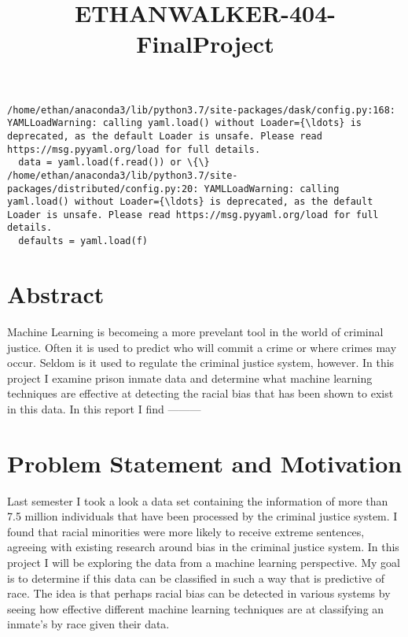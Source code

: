 \documentclass[11pt]{article}
\title{ETHANWALKER-404-FinalProject}
\begin{document}
    
    
    \maketitle
    
    

    
    \begin{Verbatim}[commandchars=\\\{\}]
/home/ethan/anaconda3/lib/python3.7/site-packages/dask/config.py:168: YAMLLoadWarning: calling yaml.load() without Loader={\ldots} is deprecated, as the default Loader is unsafe. Please read https://msg.pyyaml.org/load for full details.
  data = yaml.load(f.read()) or \{\}
/home/ethan/anaconda3/lib/python3.7/site-packages/distributed/config.py:20: YAMLLoadWarning: calling yaml.load() without Loader={\ldots} is deprecated, as the default Loader is unsafe. Please read https://msg.pyyaml.org/load for full details.
  defaults = yaml.load(f)

    \end{Verbatim}

    \hypertarget{abstract}{%
\section{Abstract}\label{abstract}}

Machine Learning is becomeing a more prevelant tool in the world of
criminal justice. Often it is used to predict who will commit a crime or
where crimes may occur. Seldom is it used to regulate the criminal
justice system, however. In this project I examine prison inmate data
and determine what machine learning techniques are effective at
detecting the racial bias that has been shown to exist in this data. In
this report I find ---------

\hypertarget{problem-statement-and-motivation}{%
\section{Problem Statement and
Motivation}\label{problem-statement-and-motivation}}

Last semester I took a look a data set containing the information of
more than 7.5 million individuals that have been processed by the
criminal justice system. I found that racial minorities were more likely
to receive extreme sentences, agreeing with existing research around
bias in the criminal justice system. In this project I will be exploring
the data from a machine learning perspective. My goal is to determine if
this data can be classified in such a way that is predictive of race.
The idea is that perhaps racial bias can be detected in various systems
by seeing how effective different machine learning techniques are at
classifying an inmate's by race given their data.
\end{document}
